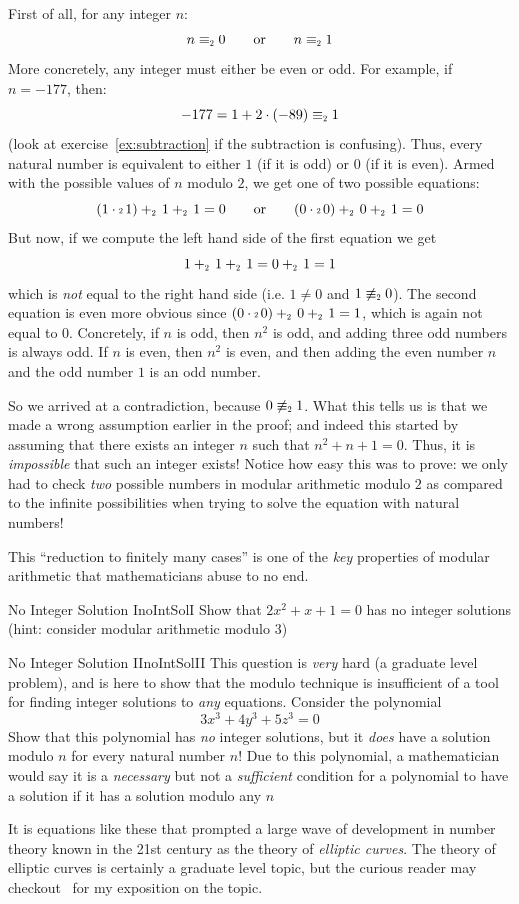 \documentclass{article}
\newcommand\scalemath[2]{\scalebox{#1}{\mbox{\ensuremath{\displaystyle #2}}}}
\newcommand{\Equiv}[1]{\equiv_{\scalemath{0.6}{#1}}}
\newcommand{\Plus}[1]{+_{\scalemath{0.6}{#1}}\,}
\newcommand{\Cdot}[1]{\cdot{\scalemath{0.6}{#1}}\,}
\begin{document}
First of all, for any integer $n$:
\[
  n\Equiv{2} 0 \qquad \text{or} \qquad n\Equiv{2}1
\]
More concretely, any integer must either be even or odd. For example, if $n = -177$, then:
\[
  -177 = 1 + 2\cdot (-89) \Equiv{2} 1
\]
(look at exercise~\ref{ex:subtraction} if the subtraction is confusing). Thus, every natural number is
equivalent to either $1$ (if it is odd) or $0$ (if it is even). Armed with the
possible values of $n$ modulo $2$, we get one of two possible equations:
\[
  (1\Cdot{2}1) \Plus{2} 1 \Plus{2} 1 = 0 \qquad \text{or} \qquad (0\Cdot{2}0) \Plus{2}0\Plus{2} 1 = 0
\]
But now, if we compute the left hand side of the first equation we get
\[
  1\Plus{2}1\Plus{2}1 = 0\Plus{2}1 = 1
\]
which is \emph{not} equal to the right hand side (i.e. $1\ne 0$ and $1\not\Equiv{2}0$). The second equation is
even more obvious since $(0\Cdot{2}0) \Plus{2}0\Plus{2} 1 = 1$, which is again not equal to $0$. Concretely,
if $n$ is odd, then $n^2$ is odd, and adding three odd numbers is always odd. If $n$ is even, then $n^2$ is
even, and then adding the even number $n$ and the odd number $1$ is an odd number.

So we arrived at a contradiction, because $0\not\Equiv{2} 1$. What this tells us is
that we made a wrong assumption earlier in the proof; and indeed this started by assuming that there exists an
integer $n$ such that $n^2+n+1=0$. Thus, it is \emph{impossible} that such an integer exists! Notice how easy
this was to prove: we only had to check \emph{two} possible numbers in modular arithmetic modulo $2$ as
compared to the infinite possibilities when trying to solve the equation with natural numbers!

This ``reduction to finitely many cases'' is one of the \emph{key} properties of modular arithmetic that
mathematicians abuse to no end.

\begin{exercise}{No Integer Solution I}{noIntSolI}
  Show that $2x^2+x+1=0$ has no integer solutions (hint: consider modular arithmetic modulo $3$)
\end{exercise}

\begin{exercise}{No Integer Solution II}{noIntSolII}
  This question is \emph{very} hard (a graduate level problem), and is here to show that the modulo technique
  is insufficient of a tool for finding integer solutions to \emph{any} equations. Consider the polynomial
  \[
    3x^3 + 4y^3 + 5z^3=0
  \]
  Show that this polynomial has \emph{no} integer solutions, but it \emph{does} have a solution modulo $n$ for
  every natural number $n$! Due to this polynomial, a mathematician would say it is a \emph{necessary} but not
  a \emph{sufficient} condition for a polynomial to have a solution if it has a solution modulo any $n$

  It is equations like these that prompted a large wave of development in number theory known in the 21st
  century as the theory of \emph{elliptic curves}. The theory of elliptic curves is certainly a graduate
  level topic, but the curious reader may checkout~\cite{NateEllipticCurve} for my exposition on the topic.
\end{exercise}
\end{document}
